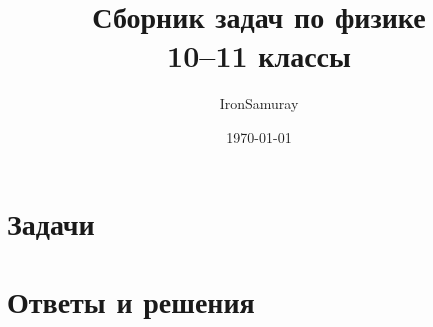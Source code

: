 \documentclass[12pt, a4paper]{report}
\title{Сборник задач по физике \\ 10–11 классы}
\author{IronSamuray}
\date{\today}
\begin{document}
\maketitle
\tableofcontents
\newpage

\part{Задачи}


\clearpage
\part{Ответы и решения}

\end{document}
